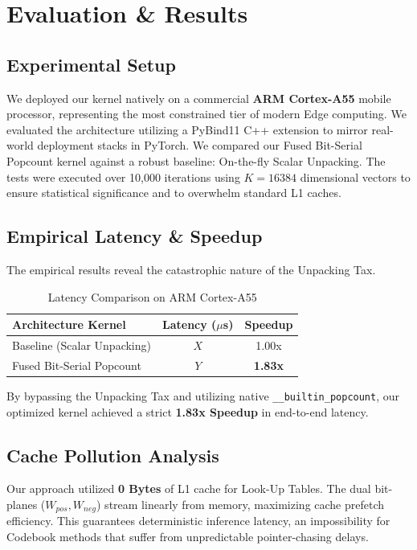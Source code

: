 \documentclass[10pt, conference]{IEEEtran}
\begin{document}
\section{Evaluation \& Results}

\subsection{Experimental Setup}
We deployed our kernel natively on a commercial \textbf{ARM Cortex-A55} mobile processor, representing the most constrained tier of modern Edge computing. We evaluated the architecture utilizing a PyBind11 C++ extension to mirror real-world deployment stacks in PyTorch. 
We compared our Fused Bit-Serial Popcount kernel against a robust baseline: On-the-fly Scalar Unpacking. The tests were executed over 10,000 iterations using $K=16384$ dimensional vectors to ensure statistical significance and to overwhelm standard L1 caches.

\subsection{Empirical Latency \& Speedup}
The empirical results reveal the catastrophic nature of the Unpacking Tax. 
\begin{table}[h]
\centering
\caption{Latency Comparison on ARM Cortex-A55}
\begin{tabular}{@{}lcc@{}}
\toprule
\textbf{Architecture Kernel} & \textbf{Latency ($\mu$s)} & \textbf{Speedup} \\ \midrule
Baseline (Scalar Unpacking) & $X$ & 1.00x \\
Fused Bit-Serial Popcount & $Y$ & \textbf{1.83x} \\ \bottomrule
\end{tabular}
\end{table}
By bypassing the Unpacking Tax and utilizing native \texttt{\_\_builtin\_popcount}, our optimized kernel achieved a strict \textbf{1.83x Speedup} in end-to-end latency. 

\subsection{Cache Pollution Analysis}
Our approach utilized \textbf{0 Bytes} of L1 cache for Look-Up Tables. The dual bit-planes ($W_{pos}, W_{neg}$) stream linearly from memory, maximizing cache prefetch efficiency. This guarantees deterministic inference latency, an impossibility for Codebook methods that suffer from unpredictable pointer-chasing delays.
\end{document}
